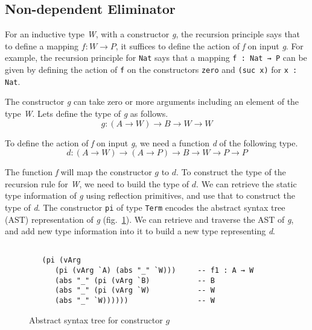\documentclass[sigplan,10pt]{acmart}
\begin{document}
\subsection{Non-dependent Eliminator}
\label{sec:sec3.1}

For an inductive type \emph{W}, with a constructor \emph{g}, the recursion principle says that to define a mapping $f : W \rightarrow P$, it suffices to define the action of \emph{f} on input \emph{g}. For example, the recursion principle for {\tt Nat} says that a mapping {\tt f : Nat → P} can be given by defining the action of {\tt f} on the constructors {\tt zero} and {\tt (suc x)} for {\tt x : Nat}. 

The constructor \emph{g} can take zero or more arguments including an element of the type \emph{W}. Lets define the type of \emph{g} as follows.
\begin{equation}
g : (A \rightarrow W) \rightarrow B \rightarrow W \rightarrow W \nonumber
\end{equation}

To define the action of \emph{f} on input \emph{g}, we need a function \emph{d} of the following type.
\begin{equation}
d : (A \rightarrow W) \rightarrow (A \rightarrow P) \rightarrow B \rightarrow W \rightarrow P \rightarrow P \nonumber
\end{equation}

The function \emph{f} will map the constructor $g$ to $d$. To construct the type of the recursion rule for \emph{W}, we need to build the type of $d$. We can retrieve the static type information of \emph{g} using reflection primitives, and use that to construct the type of \emph{d}. The constructor {\tt pi} of type {\tt Term} encodes the abstract syntax tree (AST) representation of \emph{g} (fig.~\ref{fig:ast-g}). We can retrieve and traverse the AST of \emph{g}, and add new type information into it to build a new type representing \emph{d}.

\begin{figure}
\begin{center}
\begingroup
\fontsize{7pt}{9pt}\selectfont
\begin{Verbatim}[frame = single]

   (pi (vArg 
      (pi (vArg `A) (abs "_" `W)))     -- f1 : A → W
      (abs "_" (pi (vArg `B)           -- B
      (abs "_" (pi (vArg `W)           -- W
      (abs "_" `W))))))                -- W

\end{Verbatim}
\endgroup
\end{center}
\caption{Abstract syntax tree for constructor $g$}
\label{fig:ast-g}
\end{figure}
\end{document}
